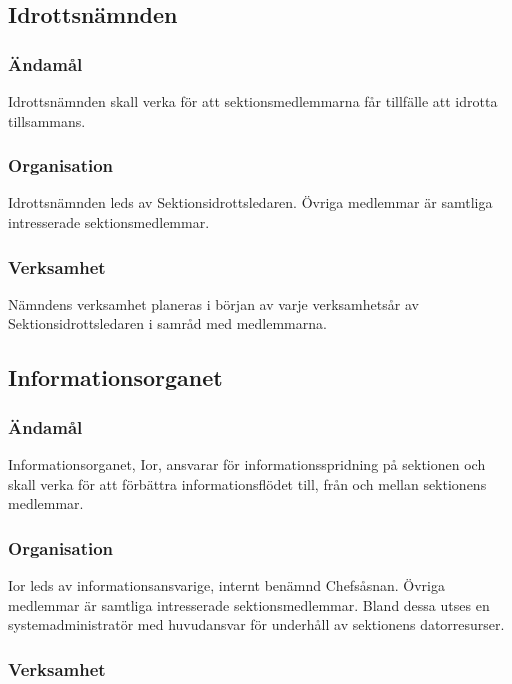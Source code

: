 \documentclass[a4paper,12pt]{article}
\begin{document}
\subsection{Idrottsnämnden}

\subsubsection{Ändamål}

Idrottsnämnden skall verka för att sektionsmedlemmarna får tillfälle att idrotta tillsammans.

\subsubsection{Organisation}

Idrottsnämnden leds av Sektionsidrottsledaren. Övriga medlemmar är samtliga intresserade sektionsmedlemmar.

\subsubsection{Verksamhet}

Nämndens verksamhet planeras i början av varje verksamhetsår av Sektionsidrottsledaren i samråd med medlemmarna.

\subsection{Informationsorganet}

\subsubsection{Ändamål}

Informationsorganet, Ior, ansvarar för informationsspridning på sektionen och skall verka för att förbättra informationsflödet till, från och mellan sektionens medlemmar.

\subsubsection{Organisation}

Ior leds av informationsansvarige, internt benämnd Chefsåsnan. Övriga medlemmar är samtliga intresserade sektionsmedlemmar. Bland dessa utses en systemadministratör med huvudansvar för underhåll av sektionens datorresurser.

\subsubsection{Verksamhet}
\end{document}
